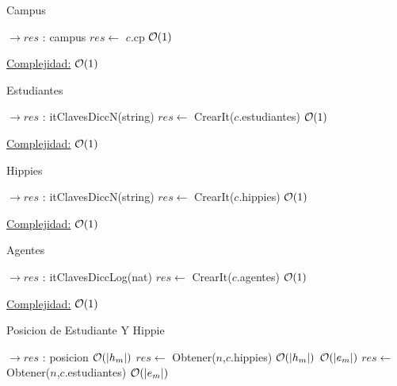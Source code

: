 \begin{Algoritmos}

\begin{algorithm}[H]
\caption{Campus}

\begin{algorithmic}[1]
  $\to res$ : campus
  \State $res \gets$ $c$.cp \Comment $\mathcal{O}(1)$
 \EndProcedure
\end{algorithmic}

 \underline{Complejidad:} $\mathcal{O}(1)$
\end{algorithm}


\begin{algorithm}[H]
\caption{Estudiantes}

\begin{algorithmic}[1]
  $\to res$ : itClavesDiccN(string)
  \State $res \gets$ CrearIt($c$.estudiantes) \Comment $\mathcal{O}(1)$
 \EndProcedure
\end{algorithmic}
 \underline{Complejidad:} $\mathcal{O}(1)$
\end{algorithm}


\begin{algorithm}[H]
\caption{Hippies}
\begin{algorithmic}[1]
	 $\to res$ : itClavesDiccN(string)
	\State $res \gets$ CrearIt($c$.hippies) \Comment $\mathcal{O}(1)$
	\EndProcedure
\end{algorithmic}
\underline{Complejidad:} $\mathcal{O}(1)$
\end{algorithm}


\begin{algorithm}[H]
\caption{Agentes}
\begin{algorithmic}[1]
	 $\to res$ : itClavesDiccLog(nat)
	\State $res \gets$ CrearIt($c$.agentes) \Comment $\mathcal{O}(1)$
	\EndProcedure
\end{algorithmic}
\underline{Complejidad:} $\mathcal{O}(1)$
\end{algorithm}



\begin{algorithm}[H]
\caption{Posicion de Estudiante Y Hippie}

\begin{algorithmic}[1]
 $\to res$ : posicion
	 \Comment $\mathcal{O}(|h_m|)$
		\State $res \gets$ Obtener($n$,$c$.hippies) \Comment $\mathcal{O}(|h_m|)$
	\Else
		 \Comment $\mathcal{O}(|e_m|)$
			\State $res \gets$ Obtener($n$,$c$.estudiantes) \Comment $\mathcal{O}(|e_m|)$
		\EndIf
	\EndIf	
 \EndProcedure
\end{algorithmic}


\end{algorithm}
\end{Algoritmos}
